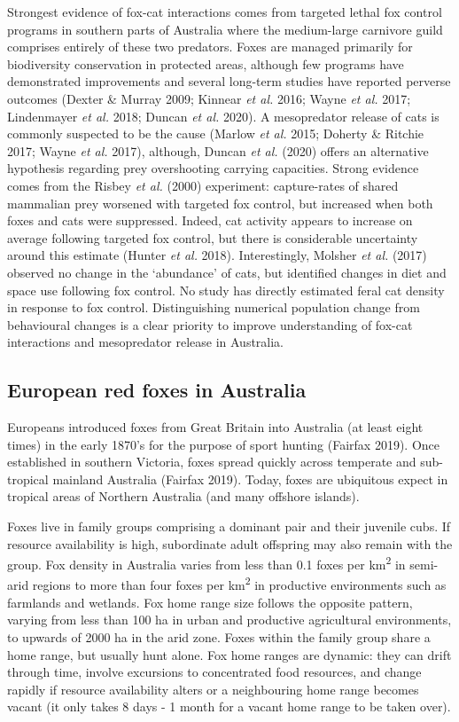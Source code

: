 \documentclass[11pt,a4paper,titlepage,twoside,openright]{style/unimelbthesis}
\begin{document}
\begin{mainmatter}
Strongest evidence of fox-cat interactions comes from targeted lethal fox control programs in southern parts of Australia where the medium-large carnivore guild comprises entirely of these two predators. Foxes are managed primarily for biodiversity conservation in protected areas, although few programs have demonstrated improvements and several long-term studies have reported perverse outcomes (Dexter \& Murray 2009; Kinnear \emph{et al.} 2016; Wayne \emph{et al.} 2017; Lindenmayer \emph{et al.} 2018; Duncan \emph{et al.} 2020). A mesopredator release of cats is commonly suspected to be the cause (Marlow \emph{et al.} 2015; Doherty \& Ritchie 2017; Wayne \emph{et al.} 2017), although, Duncan \emph{et al.} (2020) offers an alternative hypothesis regarding prey overshooting carrying capacities. Strong evidence comes from the Risbey \emph{et al.} (2000) experiment: capture-rates of shared mammalian prey worsened with targeted fox control, but increased when both foxes and cats were suppressed. Indeed, cat activity appears to increase on average following targeted fox control, but there is considerable uncertainty around this estimate (Hunter \emph{et al.} 2018). Interestingly, Molsher \emph{et al.} (2017) observed no change in the `abundance' of cats, but identified changes in diet and space use following fox control. No study has directly estimated feral cat density in response to fox control. Distinguishing numerical population change from behavioural changes is a clear priority to improve understanding of fox-cat interactions and mesopredator release in Australia.

\hypertarget{european-red-foxes-in-australia}{%
\subsection{European red foxes in Australia}\label{european-red-foxes-in-australia}}

Europeans introduced foxes from Great Britain into Australia (at least eight times) in the early 1870's for the purpose of sport hunting (Fairfax 2019). Once established in southern Victoria, foxes spread quickly across temperate and sub-tropical mainland Australia (Fairfax 2019). Today, foxes are ubiquitous expect in tropical areas of Northern Australia (and many offshore islands).

Foxes live in family groups comprising a dominant pair and their juvenile cubs. If resource availability is high, subordinate adult offspring may also remain with the group. Fox density in Australia varies from less than 0.1 foxes per km\textsuperscript{2} in semi-arid regions to more than four foxes per km\textsuperscript{2} in productive environments such as farmlands and wetlands. Fox home range size follows the opposite pattern, varying from less than 100 ha in urban and productive agricultural environments, to upwards of 2000 ha in the arid zone. Foxes within the family group share a home range, but usually hunt alone. Fox home ranges are dynamic: they can drift through time, involve excursions to concentrated food resources, and change rapidly if resource availability alters or a neighbouring home range becomes vacant (it only takes 8 days - 1 month for a vacant home range to be taken over).


\end{mainmatter}
\end{document}
